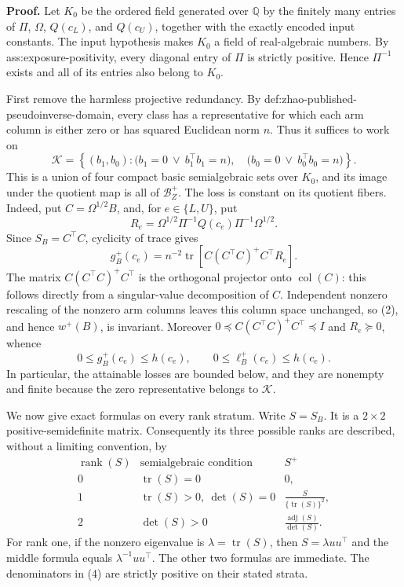 \textbf{Proof.}
Let \(K_0\) be the ordered field generated over \(\mathbb Q\) by the finitely many entries of \(\Pi\), \(\Omega\), \(Q(c_L)\), and \(Q(c_U)\), together with the exactly encoded input constants.  The input hypothesis makes \(K_0\) a field of real-algebraic numbers.  By ass:exposure-positivity, every diagonal entry of \(\Pi\) is strictly positive.  Hence \(\Pi^{-1}\) exists and all of its entries also belong to \(K_0\).

First remove the harmless projective redundancy.  By def:zhao-published-pseudoinverse-domain, every class has a representative for which each arm column is either zero or has squared Euclidean norm \(n\).  Thus it suffices to work on
\[
 \mathcal K
 =\left\{(b_1,b_0):
   \bigl(b_1=0\ \vee\ b_1^{\top}b_1=n\bigr),\quad
   \bigl(b_0=0\ \vee\ b_0^{\top}b_0=n\bigr)
  \right\}.
\tag{1}
\]
This is a union of four compact basic semialgebraic sets over \(K_0\), and its image under the quotient map is all of \(\mathcal B_Z^+\).  The loss is constant on its quotient fibers.  Indeed, put \(C=\Omega^{1/2}B\), and, for \(e\in\{L,U\}\), put
\[
 R_e=\Omega^{1/2}\Pi^{-1}Q(c_e)\Pi^{-1}\Omega^{1/2}.
\]
Since \(S_B=C^{\top}C\), cyclicity of trace gives
\[
 g_B^+(c_e)
 =n^{-2}\operatorname{tr}\!\left[
 C(C^{\top}C)^+C^{\top}R_e
 \right].
\tag{2}
\]
The matrix \(C(C^{\top}C)^+C^{\top}\) is the orthogonal projector onto \(\operatorname{col}(C)\): this follows directly from a singular-value decomposition of \(C\).  Independent nonzero rescaling of the nonzero arm columns leaves this column space unchanged, so (2), and hence \(w^+(B)\), is invariant.  Moreover \(0\preceq C(C^{\top}C)^+C^{\top}\preceq I\) and \(R_e\succeq0\), whence
\[
 0\le g_B^+(c_e)\le h(c_e),
 \qquad
 0\le \ell_B^+(c_e)\le h(c_e).
\tag{3}
\]
In particular, the attainable losses are bounded below, and they are nonempty and finite because the zero representative belongs to \(\mathcal K\).

We now give exact formulas on every rank stratum.  Write \(S=S_B\).  It is a \(2\times2\) positive-semidefinite matrix.  Consequently its three possible ranks are described, without a limiting convention, by
\[
\begin{array}{c|c|c}
\operatorname{rank}(S)&\text{semialgebraic condition}&S^+\\ \hline
0&\operatorname{tr}(S)=0&0,\\[2mm]
1&\operatorname{tr}(S)>0,\ \det(S)=0&
\displaystyle\frac{S}{\{\operatorname{tr}(S)\}^2},\\[3mm]
2&\det(S)>0&
\displaystyle\frac{\operatorname{adj}(S)}{\det(S)}.
\end{array}
\tag{4}
\]
For rank one, if the nonzero eigenvalue is \(\lambda=\operatorname{tr}(S)\), then \(S=\lambda uu^{\top}\) and the middle formula equals \(\lambda^{-1}uu^{\top}\).  The other two formulas are immediate.  The denominators in (4) are strictly positive on their stated strata.

